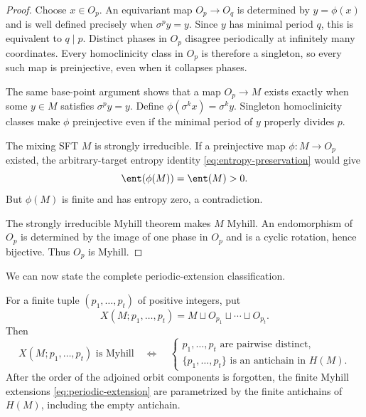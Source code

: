 \begin{proof}
Choose $x\in O_p$.  An equivariant map $O_p\to O_q$ is determined by
$y=\phi(x)$ and is well defined precisely when $\sigma^p y=y$.  Since $y$ has
minimal period $q$, this is equivalent to $q\mid p$.  Distinct phases in
$O_p$ disagree periodically at infinitely many coordinates.  Every
homoclinicity class in $O_p$ is therefore a singleton, so every such map is
preinjective, even when it collapses phases.

The same base-point argument shows that a map $O_p\to M$ exists exactly when
some $y\in M$ satisfies $\sigma^p y=y$.  Define
$\phi(\sigma^k x)=\sigma^k y$.  Singleton homoclinicity classes make $\phi$
preinjective even if the minimal period of $y$ properly divides $p$.

The mixing SFT $M$ is strongly irreducible.  If a preinjective map
$\phi:M\to O_p$ existed, the arbitrary-target entropy identity
\eqref{eq:entropy-preservation} would give
\[
  \ent(\phi(M))=\ent(M)>0.
\]
But $\phi(M)$ is finite and has entropy zero, a contradiction.

The strongly irreducible Myhill theorem makes $M$ Myhill.  An endomorphism of
$O_p$ is determined by the image of one phase in $O_p$ and is a cyclic
rotation, hence bijective.  Thus $O_p$ is Myhill.
\end{proof}

We can now state the complete periodic-extension classification.

\begin{theorem}
\label{thm:antichain}
For a finite tuple $(p_1,\ldots,p_t)$ of positive integers, put
\begin{equation}
 X(M;p_1,\ldots,p_t)
 =M\sqcup O_{p_1}\sqcup\cdots\sqcup O_{p_t}.
 \label{eq:periodic-extension}
\end{equation}
Then
\begin{equation}
 X(M;p_1,\ldots,p_t)\text{ is Myhill}
 \quad\Longleftrightarrow\quad
 \begin{cases}
 p_1,\ldots,p_t\text{ are pairwise distinct},\\
 \{p_1,\ldots,p_t\}\text{ is an antichain in }H(M).
 \end{cases}
 \label{eq:antichain-iff}
\end{equation}
After the order of the adjoined orbit components is forgotten, the finite
Myhill extensions \eqref{eq:periodic-extension} are parametrized by the finite
antichains of $H(M)$, including the empty antichain.
\end{theorem}

